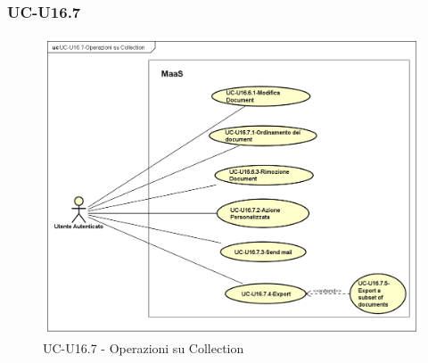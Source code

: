 \subsubsection{UC-U16.7}
 

    \begin{figure}[H]
      \begin{center}
        \includegraphics[width=12cm]{res/img/UCUtenti/UCUtenteA/UC-U16.7-Operazioni_su_Collection/UC-U16.7-Operazioni_su_Collection}
      \caption{UC-U16.7 - Operazioni su Collection}
      \end{center} 
    \end{figure}


